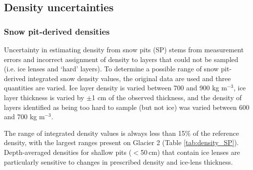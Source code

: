 \documentclass{sfuthesis}
\begin{document}
\subsection{Density uncertainties}

\subsubsection{Snow pit-derived densities}

Uncertainty in estimating density from snow pits (SP) stems from measurement errors and incorrect assignment of density to layers that could not be sampled (i.e. ice lenses and `hard' layers). To determine a possible range of snow pit-derived integrated snow density values, the original data are used and three quantities are varied. Ice layer density is varied between 700 and 900 kg m$^{-3}$, ice layer thickness is varied by $\pm$1 cm of the observed thickness, and the density of layers identified as being too hard to sample (but not ice) was varied between 600 and 700 kg m$^{-3}$. 

The range of integrated density values is always less than 15\% of the reference density, with the largest ranges present on Glacier 2 (Table \ref{tab:density_SP}). Depth-averaged densities for shallow pits ($<$50\,cm) that contain ice lenses are particularly sensitive to changes in prescribed density and ice-lens thickness.
\end{document}
